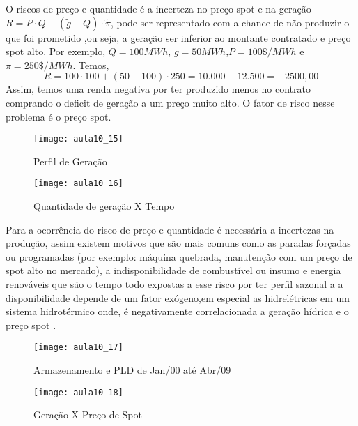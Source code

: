   O riscos de preço e quantidade é a incerteza no preço spot e na geração $R=P\cdot Q+(\tilde{g}-Q)\cdot\tilde{\pi}$, pode ser representado com a chance de não produzir o que foi prometido ,ou seja, a geração ser inferior ao montante contratado e preço spot alto. 
  Por exemplo, $Q=100MWh$, $g=50MWh$,$P=100\$/MWh$ e $\pi=250\$/MWh$.
  Temos,
$$ R=100\cdot 100+(50-100)\cdot 250=10.000-12.500=-2500,00 $$
Assim, temos uma renda negativa por ter produzido menos no contrato comprando o deficit de geração a um preço muito alto. O fator de risco nesse problema é o preço spot.

\begin{figure}[H]
\begin{centering}
\texttt{[image: aula10\_15]}\protect\caption{\label{fig:aula10_15}Perfil de Geração }
\end{centering}
\end{figure}

\begin{figure}[H]
\begin{centering}
\texttt{[image: aula10\_16]}\protect\caption{\label{fig:aula10_16} Quantidade de geração X Tempo}
\end{centering}
\end{figure}
 Para a ocorrência do risco de preço e quantidade é necessária a incertezas na produção, assim existem motivos que são mais comuns como as paradas forçadas ou programadas (por exemplo: máquina quebrada, manutenção com um preço de spot alto no mercado), a indisponibilidade de combustível ou insumo e energia renováveis que são o tempo todo expostas a esse risco por ter perfil sazonal a a disponibilidade depende de um fator exógeno,em especial as hidrelétricas em um sistema hidrotérmico onde, é negativamente correlacionada a geração hídrica e o preço spot .

\begin{figure}[H]
\begin{centering}
\texttt{[image: aula10\_17]}\protect\caption{\label{fig:aula10_17} Armazenamento e PLD de Jan/00 até Abr/09 }
\end{centering}
\end{figure}
\begin{figure}[H]
\begin{centering}
\texttt{[image: aula10\_18]}\protect\caption{\label{fig:aula10_18} Geração X Preço de Spot}
\end{centering}
\end{figure}

